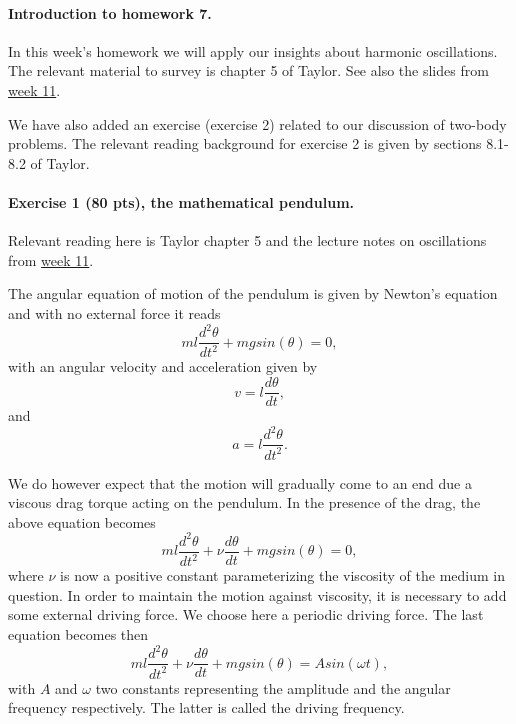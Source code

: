 \documentclass[%
oneside,                 %
final,                   %
10pt]{article}
\begin{document}
\noindent
\paragraph{Introduction to homework 7.}
In this week's homework we will apply our insights about harmonic
oscillations. The relevant material to survey is chapter 5 of Taylor.
See also the slides from \href{{https://mhjensen.github.io/Physics321/doc/pub/week10/html/week10.html}}{week 11}.

We have also added an exercise (exercise 2) related to our discussion of two-body problems. 
The relevant reading background for exercise 2 is given by sections 8.1-8.2 of Taylor.

\paragraph{Exercise 1 (80 pts), the mathematical pendulum.}
Relevant reading here is Taylor chapter 5 and the lecture notes on oscillations from \href{{https://mhjensen.github.io/Physics321/doc/pub/week10/html/week10.html}}{week 11}.

The angular equation of motion of the pendulum is given by
Newton's equation and with no external force it reads 
\begin{equation}
  ml\frac{d^2\theta}{dt^2}+mgsin(\theta)=0,
\end{equation}
with an angular velocity and acceleration given by
\begin{equation}
     v=l\frac{d\theta}{dt},
\end{equation}
and
\begin{equation}
     a=l\frac{d^2\theta}{dt^2}.
\end{equation}

We do however expect that the motion will gradually come to an end
due a viscous drag torque acting on the pendulum. 
In the presence of the drag, the above equation becomes
\begin{equation}
   ml\frac{d^2\theta}{dt^2}+\nu\frac{d\theta}{dt}  +mgsin(\theta)=0,
\label{eq:pend1}
\end{equation}
where $\nu$ is now a positive constant parameterizing the viscosity
of the medium in question. In order to maintain the motion against
viscosity, it is necessary to add some external driving force. 
We choose here a periodic driving force. The last equation becomes then
\begin{equation}
   ml\frac{d^2\theta}{dt^2}+\nu\frac{d\theta}{dt}  +mgsin(\theta)=Asin(\omega t),
\label{eq:pend2}
\end{equation}
with $A$ and $\omega$ two constants representing the amplitude and 
the angular frequency respectively. The latter is called the driving frequency.
\end{document}
